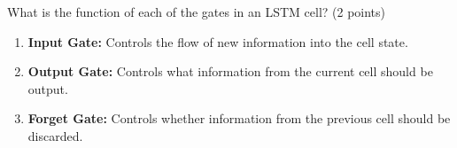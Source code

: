 What is the function of each of the gates in an LSTM cell? (2 points)

\begin{tcolorbox}
\begin{enumerate}
  \item \textbf{Input Gate:} Controls the flow of new information into the cell state.
  \item \textbf{Output Gate:} Controls what information from the current cell should be output.
  \item \textbf{Forget Gate:} Controls whether information from the previous cell should be discarded.
\end{enumerate}
\end{tcolorbox}
